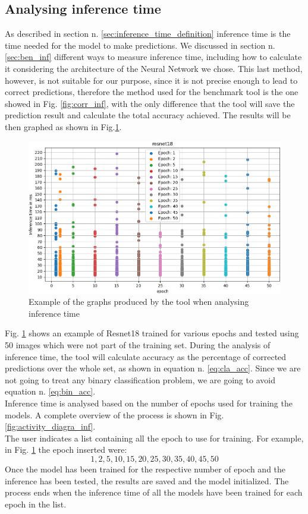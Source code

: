 \subsection{Analysing inference time}
As described in section n. \ref{sec:inference_time_definition} inference time is the time needed for the model to make predictions. We discussed in section n. \ref{sec:ben_inf} different ways to measure inference time, including how to calculate it considering the architecture of the Neural Network we chose. This last method, however, is not suitable for our purpose, since it is not precise enough to lead to correct predictions, therefore the method used for the benchmark tool is the one showed in Fig. \ref{fig:corr_inf}, with the only difference that the tool will save the prediction result and calculate the total accuracy achieved. The results will be then graphed as shown in Fig.\ref{fig:infere_graph}. 
\begin{figure}[h]
\centering
	    \includegraphics[width = \gw cm]{img/epoch_inferencetime.png}
        \caption{Example of the graphs produced by the tool when analysing inference time}
        \label{fig:infere_graph}
\end{figure}

Fig. \ref{fig:infere_graph} shows an example of Resnet18 trained for various epochs and tested using 50 images which were not part of the training set. 
During the analysis of inference time, the tool will calculate accuracy as the percentage of corrected predictions over the whole set, as shown in equation n. \ref{eq:cla_acc}. Since we are not going to treat any binary classification problem, we are going to avoid equation n. \ref{eq:bin_acc}. \\
Inference time is analysed based on the number of epochs used for training the models. A complete overview of the process is shown in Fig. \ref{fig:activity_diagra_inf}.\\
The user indicates a list containing all the epoch to use for training. For example, in Fig. \ref{fig:infere_graph} the epoch inserted were:
\[
1,2,5,10,15,20,25,30,35,40,45,50
\]
Once the model has been trained for the respective number of epoch and the inference has been tested, the results are saved and the model initialized. The process ends when the inference time of all the models have been trained for each epoch in the list. \\

